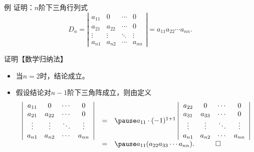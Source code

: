 \begin{frame}
  \begin{exampleblock}{例}
    证明：$n$阶下三角行列式
    $$
    D_n = \left|
    \begin{array}{cccc}
      a_{11}  &  0 & \cdots & 0 \\
      a_{21}  &  a_{22} & \cdots & 0 \\
      \vdots & \vdots & \ddots & \vdots\\  
      a_{n1}  &  a_{n2} & \cdots & a_{nn} 
    \end{array}
    \right| = a_{11} a_{22} \cdots a_{nn}.
    $$
  \end{exampleblock} \pause 

  \begin{block}{证明【数学归纳法】}
    \begin{itemize}
    \item 当$n=2$时，结论成立。\pause 
    \item 假设结论对$n-1$阶下三角阵成立，则由定义
      $$
      \begin{array}{rcl}
        \left|
        \begin{array}{cccc}
          a_{11}  &  0 & \cdots & 0 \\
          a_{21}  &  a_{22} & \cdots & 0 \\
          \vdots & \vdots & \ddots & \vdots\\  
          a_{n1}  &  a_{n2} & \cdots & a_{nn} 
        \end{array}
        \right| &=& \pause a_{11} \cdot (-1)^{1+1} \left|
        \begin{array}{cccc}
          a_{22}  &  0 & \cdots & 0 \\
          a_{31}  &  a_{33} & \cdots & 0 \\
          \vdots & \vdots & \ddots & \vdots\\  
          a_{n1}  &  a_{n2} & \cdots & a_{nn} 
        \end{array}
        \right| \\
        &=& \pause a_{11} (a_{22} a_{33} \cdots a_{nn}). \quad \qed        
      \end{array}
      $$    
    \end{itemize}
  \end{block}

\end{frame}

